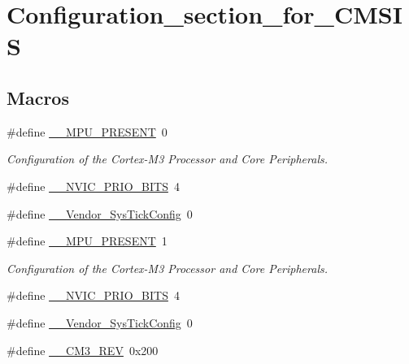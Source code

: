 \hypertarget{group___configuration__section__for___c_m_s_i_s}{\section{Configuration\-\_\-section\-\_\-for\-\_\-\-C\-M\-S\-I\-S}
\label{group___configuration__section__for___c_m_s_i_s}
}
\subsection*{Macros}
\begin{DoxyCompactItemize}
\item 
\#define \hyperlink{group___configuration__section__for___c_m_s_i_s_ga4127d1b31aaf336fab3d7329d117f448}{\-\_\-\-\_\-\-M\-P\-U\-\_\-\-P\-R\-E\-S\-E\-N\-T}~0
\begin{DoxyCompactList}\small\item\em Configuration of the Cortex-\/\-M3 Processor and Core Peripherals. \end{DoxyCompactList}\item 
\#define \hyperlink{group___configuration__section__for___c_m_s_i_s_gae3fe3587d5100c787e02102ce3944460}{\-\_\-\-\_\-\-N\-V\-I\-C\-\_\-\-P\-R\-I\-O\-\_\-\-B\-I\-T\-S}~4
\item 
\#define \hyperlink{group___configuration__section__for___c_m_s_i_s_gab58771b4ec03f9bdddc84770f7c95c68}{\-\_\-\-\_\-\-Vendor\-\_\-\-Sys\-Tick\-Config}~0
\item 
\#define \hyperlink{group___configuration__section__for___c_m_s_i_s_ga4127d1b31aaf336fab3d7329d117f448}{\-\_\-\-\_\-\-M\-P\-U\-\_\-\-P\-R\-E\-S\-E\-N\-T}~1
\begin{DoxyCompactList}\small\item\em Configuration of the Cortex-\/\-M3 Processor and Core Peripherals. \end{DoxyCompactList}\item 
\#define \hyperlink{group___configuration__section__for___c_m_s_i_s_gae3fe3587d5100c787e02102ce3944460}{\-\_\-\-\_\-\-N\-V\-I\-C\-\_\-\-P\-R\-I\-O\-\_\-\-B\-I\-T\-S}~4
\item 
\#define \hyperlink{group___configuration__section__for___c_m_s_i_s_gab58771b4ec03f9bdddc84770f7c95c68}{\-\_\-\-\_\-\-Vendor\-\_\-\-Sys\-Tick\-Config}~0
\item 
\#define \hyperlink{group___configuration__section__for___c_m_s_i_s_gac6a3f185c4640e06443c18b3c8d93f53}{\-\_\-\-\_\-\-C\-M3\-\_\-\-R\-E\-V}~0x200

\end{DoxyCompactItemize}
